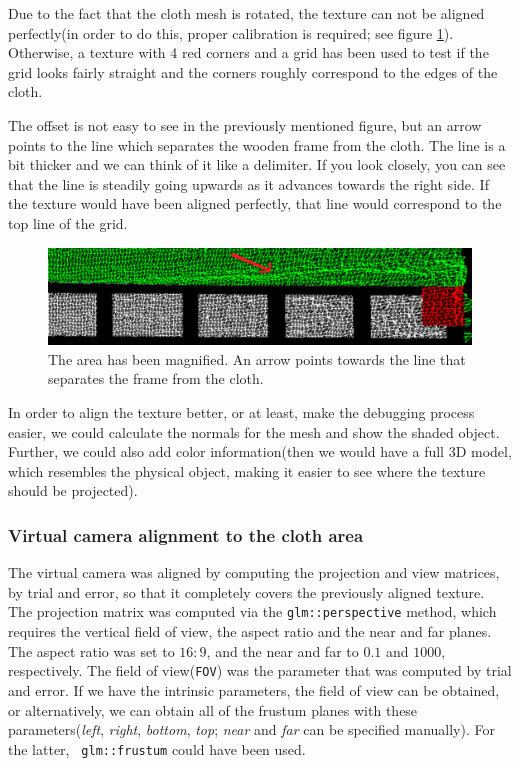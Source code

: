 \documentclass[]{article}
\begin{document}
Due to the fact that the cloth mesh is rotated, the texture can not be aligned perfectly(in order to do this, proper calibration is required; see figure \ref{fig:MisalignmentArea}). Otherwise, a texture with 4 red corners and a grid has been used to test if the grid looks fairly straight and the corners roughly correspond to the edges of the cloth. 

The offset is not easy to see in the previously mentioned figure, but an arrow points to the line which separates the wooden frame from the cloth. The line is a bit thicker and we can think of it like a delimiter. If you look closely, you can see that the line is steadily going upwards as it advances towards the right side. If the texture would have been aligned perfectly, that line would correspond to the top line of the grid.



\begin{figure}[!hbtp]
    \centering
    \includegraphics[width=1.0\textwidth]{figures/MisalignmentArea3.png}
    \caption{The area has been magnified. An arrow points towards the line that separates the frame from the cloth.}
    \label{fig:MisalignmentArea}
\end{figure}

In order to align the texture better, or at least, make the debugging process easier, we could calculate the normals for the mesh and show the shaded object. Further, we could also add color information(then we would have a full 3D model, which resembles the physical object, making it easier to see where the texture should be projected).

\subsubsection{Virtual camera alignment to the cloth area}

The virtual camera was aligned by computing the projection and view matrices, by trial and error, so that it completely covers the previously aligned texture. The projection matrix was computed via the \verb|glm::perspective| method, which requires the vertical field of view, the aspect ratio and the near and far planes. The aspect ratio was set to $16:9$, and the near and far to $0.1$ and $1000$, respectively. The field of view(\verb|FOV|) was the parameter that was computed by trial and error. If we have the intrinsic parameters, the field of view can be obtained, or alternatively, we can obtain all of the frustum planes with these parameters(\textit{left}, \textit{right}, \textit{bottom}, \textit{top}; \textit{near} and \textit{far} can be specified manually). For the latter, \verb| glm::frustum| could have been used.
\end{document}
